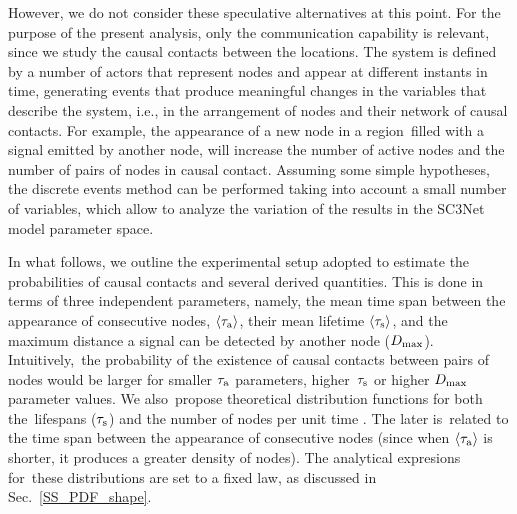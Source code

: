 \documentclass[crop]{CSLB}
\newcommand{\ceti}{node}
\newcommand{\cetis}{nodes}
\begin{document}
%
However, we do not consider these speculative alternatives at this point.
%
For the purpose of the present analysis, only the communication capability is
relevant, since we study the causal contacts between the locations.
%
The system is defined by a number of actors that represent \cetis{} and appear
at different instants in time, generating events that produce meaningful
changes in the variables that describe the system, i.e., in the arrangement of
\cetis{} and their network of causal contacts.
%
For example, the appearance of a new \ceti{} in a region filled with a signal
emitted by another node, will increase the number of active \cetis{} and the
number of pairs of \cetis{} in causal contact.
%
Assuming some simple hypotheses, the discrete events method can be performed
taking into account a small number of variables, which allow to analyze the
variation of the results in the SC3Net model parameter space.


In what follows, we outline the experimental setup adopted to estimate the
probabilities of causal contacts and several derived quantities.
%
This is done in terms of three independent parameters, namely, the mean time
span between the appearance of consecutive \cetis{}, $\left<\tau_{\rm
a}\right>$,
their mean lifetime $\left<\tau_{\rm s}\right>$, and the maximum distance a signal
can be detected by another \ceti{} ($D_{\rm max}$).
%
Intuitively, the probability of the existence of causal contacts between pairs
of \cetis{} would be larger for smaller $\tau_{\rm a}$ parameters,
higher $\tau_{\rm s}$ or
higher $D_{\rm max}$ parameter values.
%
We also propose theoretical distribution functions for both the lifespans
($\tau_{\rm s}$) and the number of \cetis{} per unit time
\citep{maccone_evolution_2014, Sotos_biotechnology_2019}.
%
The later is related to the time span between the appearance of consecutive
\cetis{} (since when $\left<\tau_{\rm a}\right>$ is shorter, it produces a greater
density of \cetis{}).
%
The analytical expresions for these distributions are set to a fixed law, as
discussed in Sec.~\ref{SS_PDF_shape}.  
    
     
\end{document}
